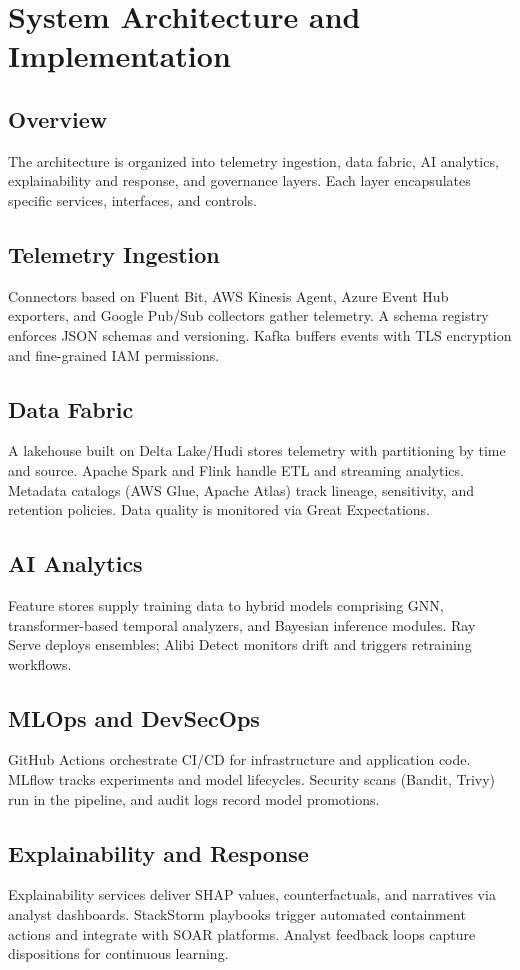 \chapter{System Architecture and Implementation}\label{chap:arch}
\section{Overview}
The architecture is organized into telemetry ingestion, data fabric, AI analytics, explainability and response, and governance layers. Each layer encapsulates specific services, interfaces, and controls.

\section{Telemetry Ingestion}
Connectors based on Fluent Bit, AWS Kinesis Agent, Azure Event Hub exporters, and Google Pub/Sub collectors gather telemetry. A schema registry enforces JSON schemas and versioning. Kafka buffers events with TLS encryption and fine-grained IAM permissions.

\section{Data Fabric}
A lakehouse built on Delta Lake/Hudi stores telemetry with partitioning by time and source. Apache Spark and Flink handle ETL and streaming analytics. Metadata catalogs (AWS Glue, Apache Atlas) track lineage, sensitivity, and retention policies. Data quality is monitored via Great Expectations.

\section{AI Analytics}
Feature stores supply training data to hybrid models comprising GNN, transformer-based temporal analyzers, and Bayesian inference modules. Ray Serve deploys ensembles; Alibi Detect monitors drift and triggers retraining workflows.

\section{MLOps and DevSecOps}
GitHub Actions orchestrate CI/CD for infrastructure and application code. MLflow tracks experiments and model lifecycles. Security scans (Bandit, Trivy) run in the pipeline, and audit logs record model promotions.

\section{Explainability and Response}
Explainability services deliver SHAP values, counterfactuals, and narratives via analyst dashboards. StackStorm playbooks trigger automated containment actions and integrate with SOAR platforms. Analyst feedback loops capture dispositions for continuous learning.


